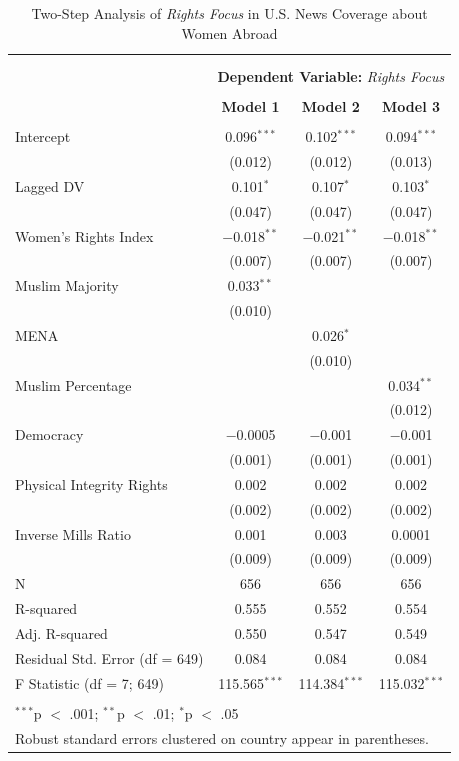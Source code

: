 \documentclass[11pt, oneside]{article}
\begin{document}
\begin{table}[!htbp] \centering 
  \caption{Two-Step Analysis of \emph{Rights Focus} in U.S. News Coverage about Women Abroad} 
  \label{} 
\begin{tabular}{@{\extracolsep{5pt}}lccc} 
\\[-1.8ex]\hline \\[-1.8ex] 
\\[-1.8ex] & \multicolumn{3}{c}{\textbf{Dependent Variable:} \emph{Rights Focus}} \\
\\[-1.8ex] & \textbf{Model 1} & \textbf{Model 2} & \textbf{Model 3}\\ 
\hline \\[-1.8ex] 
 Intercept & 0.096$^{***}$ & 0.102$^{***}$ & 0.094$^{***}$ \\ 
  & (0.012) & (0.012) & (0.013) \\ 
  Lagged DV & 0.101$^{*}$ & 0.107$^{*}$ & 0.103$^{*}$ \\ 
  & (0.047) & (0.047) & (0.047) \\ 
  Women's Rights Index & $-$0.018$^{**}$ & $-$0.021$^{**}$ & $-$0.018$^{**}$ \\ 
  & (0.007) & (0.007) & (0.007) \\ 
  Muslim Majority & 0.033$^{**}$ &  &  \\ 
  & (0.010) &  &  \\ 
  MENA &  & 0.026$^{*}$ &  \\ 
  &  & (0.010) &  \\ 
  Muslim Percentage &  &  & 0.034$^{**}$ \\ 
  &  &  & (0.012) \\ 
  Democracy & $-$0.0005 & $-$0.001 & $-$0.001 \\ 
  & (0.001) & (0.001) & (0.001) \\ 
  Physical Integrity Rights & 0.002 & 0.002 & 0.002 \\ 
  & (0.002) & (0.002) & (0.002) \\ 
  Inverse Mills Ratio & 0.001 & 0.003 & 0.0001 \\ 
  & (0.009) & (0.009) & (0.009) \\ 
 N & 656 & 656 & 656 \\ 
R-squared & 0.555 & 0.552 & 0.554 \\ 
Adj. R-squared & 0.550 & 0.547 & 0.549 \\ 
Residual Std. Error (df = 649) & 0.084 & 0.084 & 0.084 \\ 
F Statistic (df = 7; 649) & 115.565$^{***}$ & 114.384$^{***}$ & 115.032$^{***}$ \\ 
\hline \\[-1.8ex] 
\multicolumn{4}{l}{$^{***}$p $<$ .001; $^{**}$p $<$ .01; $^{*}$p $<$ .05} \\ 
\multicolumn{4}{l}{Robust standard errors clustered on country appear in parentheses.} \\ 
\end{tabular} 
\end{table} 
\end{document}
